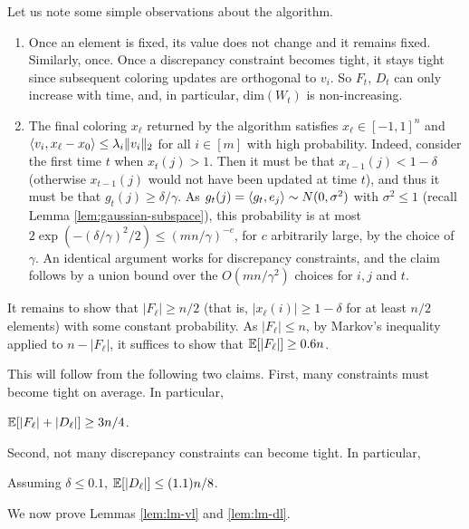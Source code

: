 \medskip
{} 
Let us note some simple observations about the algorithm.
\begin{enumerate}
    \item Once an element is fixed, its value does not change and it remains fixed. Similarly, once. Once a discrepancy constraint becomes tight, it stays tight since subsequent coloring updates are orthogonal to $v_i$. So $F_t$, $D_t$ can only increase with time, and, in particular, $\text{dim}(W_t)$ is non-increasing.
\item \label{property:lm-2} The final coloring $x_\ell$ returned by the algorithm satisfies $x_\ell \in [-1,1]^n$ and $\langle v_i,x_\ell - x_0\rangle \leq \lambda_i \|v_i\|_2 $ for all $i \in [m]$ with high probability. 
Indeed, consider the first time $t$ when $x_t(j)>1$. Then it must be that $x_{t-1}(j)< 1-\delta$ (otherwise $x_{t-1}(j)$ would not have been updated at time $t$), and thus it must be that $g_t(j) \geq \delta/\gamma$. 
As $g_t(j) = \langle g_t,e_j\rangle \sim N(0,\sigma^2)$ with $\sigma^2 \leq 1$ (recall Lemma \ref{lem:gaussian-subspace}),
this probability is at most $2 \exp(-(\delta/\gamma)^2/2) \leq (mn/\gamma)^{-c}$, for $c$ arbitrarily large,  by the choice of $\gamma$. 
An identical argument works for discrepancy constraints, and the claim follows by a union bound over the $O(mn/\gamma^2)$ choices for $i,j$ and $t$.
\end{enumerate}

  It remains to show that  $|F_\ell| \geq n/2$ (that is, $|x_{\ell}(i)| \geq 1-\delta$ for at least $n/2$ elements) with some constant probability.
As $|F_\ell| \leq n$, 
by Markov's inequality applied to $n-|F_\ell|$,
it suffices to show that $\mathbb{E}[|F_\ell|] \geq 0.6n$. 

This will follow from the following two claims.
First, many constraints must become tight on average. In particular,
\begin{lemma}
\label{lem:lm-vl}
$\mathbb{E}[|F_{\ell}| + |D_{\ell}|] \geq 3n/4$.
\end{lemma}
Second, not many discrepancy constraints can become tight. In particular, %
\begin{lemma}
\label{lem:lm-dl}
 Assuming $\delta \le 0.1$, $\mathbb{E}[|D_{\ell}|] \leq (1.1) n/8$.
\end{lemma}
We now prove Lemmas \ref{lem:lm-vl} and \ref{lem:lm-dl}.

